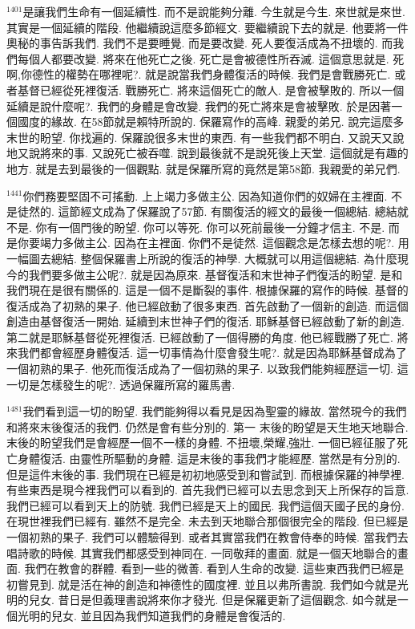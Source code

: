 \documentclass{book}
\begin{document}
$^{1401}$是讓我們生命有一個延續性.
而不是說能夠分離.
今生就是今生.
來世就是來世.
其實是一個延續的階段.
他繼續說這麼多節經文.
要繼續說下去的就是.
他要將一件奧秘的事告訴我們.
我們不是要睡覺.
而是要改變.
死人要復活成為不扭壞的.
而我們每個人都要改變.
將來在他死亡之後.
死亡是會被德性所吞滅.
這個意思就是.
死啊,你德性的權勢在哪裡呢?.
就是說當我們身體復活的時候.
我們是會戰勝死亡.
或者基督已經從死裡復活.
戰勝死亡.
將來這個死亡的敵人.
是會被擊敗的.
所以一個延續是說什麼呢?.
我們的身體是會改變.
我們的死亡將來是會被擊敗.
於是因著一個國度的緣故.
在58節就是賴特所說的.
保羅寫作的高峰.
親愛的弟兄.
說完這麼多末世的盼望.
你找遍的.
保羅說很多末世的東西.
有一些我們都不明白.
又說天又說地又說將來的事.
又說死亡被吞噬.
說到最後就不是說死後上天堂.
這個就是有趣的地方.
就是去到最後的一個觀點.
就是保羅所寫的竟然是第58節.
我親愛的弟兄們.

$^{1441}$你們務要堅固不可搖動.
上上竭力多做主公.
因為知道你們的奴婦在主裡面.
不是徒然的.
這節經文成為了保羅說了57節.
有關復活的經文的最後一個總結.
總結就不是.
你有一個門後的盼望.
你可以等死.
你可以死前最後一分鐘才信主.
不是.
而是你要竭力多做主公.
因為在主裡面.
你們不是徒然.
這個觀念是怎樣去想的呢?.
用一幅圖去總結.
整個保羅書上所說的復活的神學.
大概就可以用這個總結.
為什麼現今的我們要多做主公呢?.
就是因為原來.
基督復活和末世神子們復活的盼望.
是和我們現在是很有關係的.
這是一個不是斷裂的事件.
根據保羅的寫作的時候.
基督的復活成為了初熟的果子.
他已經啟動了很多東西.
首先啟動了一個新的創造.
而這個創造由基督復活一開始.
延續到末世神子們的復活.
耶穌基督已經啟動了新的創造.
第二就是耶穌基督從死裡復活.
已經啟動了一個得勝的角度.
他已經戰勝了死亡.
將來我們都會經歷身體復活.
這一切事情為什麼會發生呢?.
就是因為耶穌基督成為了一個初熟的果子.
他死而復活成為了一個初熟的果子.
以致我們能夠經歷這一切.
這一切是怎樣發生的呢?.
透過保羅所寫的羅馬書.

$^{1481}$我們看到這一切的盼望.
我們能夠得以看見是因為聖靈的緣故.
當然現今的我們和將來末後復活的我們.
仍然是會有些分別的.
第一 末後的盼望是天生地天地聯合.
末後的盼望我們是會經歷一個不一樣的身體.
不扭壞,榮耀,強壯.
一個已經征服了死亡身體復活.
由靈性所驅動的身體.
這是末後的事我們才能經歷.
當然是有分別的.
但是這件末後的事.
我們現在已經是初初地感受到和嘗試到.
而根據保羅的神學裡.
有些東西是現今裡我們可以看到的.
首先我們已經可以去思念到天上所保存的旨意.
我們已經可以看到天上的防號.
我們已經是天上的國民.
我們這個天國子民的身份.
在現世裡我們已經有.
雖然不是完全.
未去到天地聯合那個很完全的階段.
但已經是一個初熟的果子.
我們可以體驗得到.
或者其實當我們在教會侍奉的時候.
當我們去唱詩歌的時候.
其實我們都感受到神同在.
一同敬拜的畫面.
就是一個天地聯合的畫面.
我們在教會的群體.
看到一些的微善.
看到人生命的改變.
這些東西我們已經是初嘗見到.
就是活在神的創造和神德性的國度裡.
並且以弗所書說.
我們如今就是光明的兒女.
昔日是但義理書說將來你才發光.
但是保羅更新了這個觀念.
如今就是一個光明的兒女.
並且因為我們知道我們的身體是會復活的.
\end{document}
